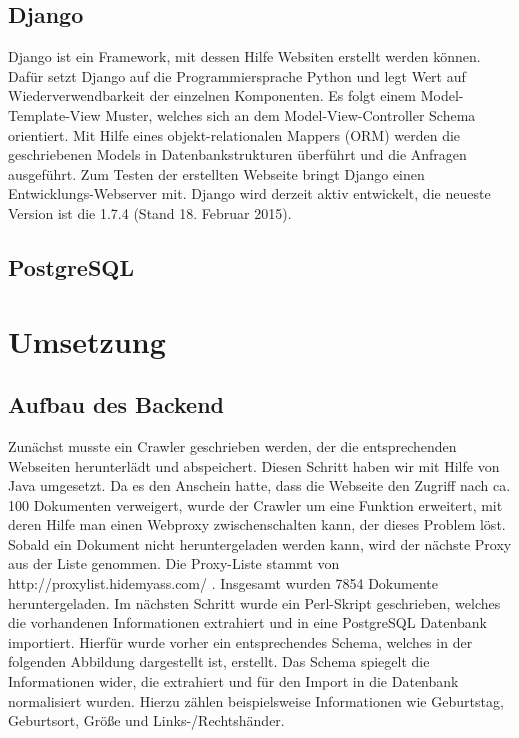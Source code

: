 \documentclass[12pt,a4paper]{article}
\begin{document}
\subsection{Django}
\label{Django}
Django ist ein Framework, mit dessen Hilfe Websiten erstellt werden können. Dafür setzt Django auf die Programmiersprache Python und legt Wert auf Wiederverwendbarkeit der einzelnen Komponenten. Es folgt einem Model-Template-View Muster, welches sich an dem Model-View-Controller Schema orientiert. Mit Hilfe eines objekt-relationalen Mappers (ORM) werden die geschriebenen Models in Datenbankstrukturen überführt und die Anfragen ausgeführt. Zum Testen der erstellten Webseite bringt Django einen Entwicklungs-Webserver mit. Django wird derzeit aktiv entwickelt, die neueste Version ist die 1.7.4 (Stand 18. Februar 2015).

\subsection{PostgreSQL}

\section{Umsetzung}

\subsection{Aufbau des Backend}
\label{Backend}
Zunächst musste ein Crawler geschrieben werden, der die entsprechenden Webseiten herunterlädt und abspeichert. Diesen Schritt haben wir mit Hilfe von Java umgesetzt. Da es den Anschein hatte, dass die Webseite den Zugriff nach ca. 100 Dokumenten verweigert, wurde der Crawler um eine Funktion erweitert, mit deren Hilfe man einen Webproxy zwischenschalten kann, der dieses Problem löst. Sobald ein Dokument nicht heruntergeladen werden kann, wird der nächste Proxy aus der Liste genommen. Die Proxy-Liste stammt von http://proxylist.hidemyass.com/ \cite{HMA2015}. Insgesamt wurden 7854 Dokumente heruntergeladen.
\newline \newline
Im nächsten Schritt wurde ein Perl-Skript geschrieben, welches die vorhandenen Informationen extrahiert und in eine PostgreSQL Datenbank importiert. Hierfür wurde vorher ein entsprechendes Schema, welches in der folgenden Abbildung dargestellt ist, erstellt. Das Schema spiegelt die Informationen wider, die extrahiert und für den Import in die Datenbank normalisiert wurden. Hierzu zählen beispielsweise Informationen wie Geburtstag, Geburtsort, Größe und Links-/Rechtshänder.
\end{document}
